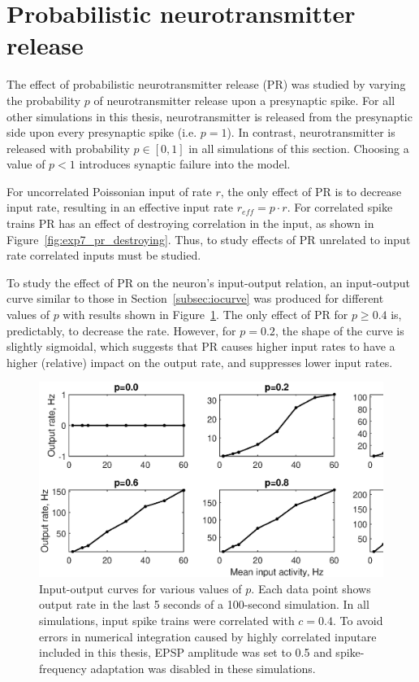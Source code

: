 \documentclass[a4paper,12pt]{report}
\theoremstyle{definition}
\begin{document}
\section{Probabilistic neurotransmitter release} %
\label{sec:probrelease}

The effect of probabilistic neurotransmitter release (PR) was studied by varying the probability $p$ of neurotransmitter release upon a presynaptic spike. For all other simulations in this thesis, neurotransmitter is released from the presynaptic side upon every presynaptic spike (i.e. $p=1$). In contrast, neurotransmitter is released with probability $p \in [0,1]$ in all simulations of this section. Choosing a value of $p<1$ introduces synaptic failure into the model.

For uncorrelated Poissonian input of rate $r$, the only effect of PR is to decrease input rate, resulting in an effective input rate $r_{eff} = p \cdot r$. For correlated spike trains PR has an effect of destroying correlation in the input, as shown in Figure~\ref{fig:exp7_pr_destroying}. Thus, to study effects of PR unrelated to input rate correlated inputs must be studied.



To study the effect of PR on the neuron's input-output relation, an input-output curve similar to those in Section~\ref{subsec:iocurve} was produced for different values of $p$ with results shown in Figure~\ref{fig:exp8gridoutputs}. The only effect of PR for $p \geq 0.4$ is, predictably, to decrease the rate. However, for $p=0.2$, the shape of the curve is slightly sigmoidal, which suggests that PR causes higher input rates to have a higher (relative) impact on the output rate, and suppresses lower input rates.

\begin{figure}[!htb]
    \includegraphics[width=\textwidth]{figures/exp8_gridoutputs_epsp05.eps}
    \caption{Input-output curves for various values of $p$. Each data point shows output rate in the last 5 seconds of a 100-second simulation. In all simulations, input spike trains were correlated with $c=0.4$. To avoid errors in numerical integration caused by highly correlated inputare included in this thesis, EPSP amplitude was set to 0.5 and spike-frequency adaptation was disabled in these simulations.}
    \label{fig:exp8gridoutputs}
\end{figure}
\end{document}
